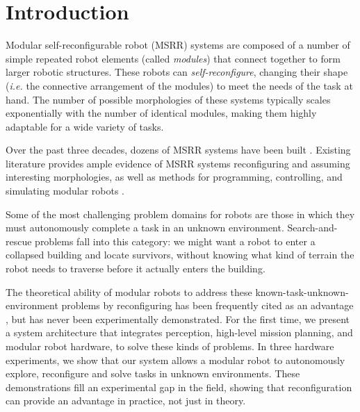 \documentclass[conference]{IEEEtran}
\begin{document}
\IEEEpeerreviewmaketitle


\section{Introduction} \label{sec:introduction}
%
Modular self-reconfigurable robot (MSRR) systems are composed of a number of simple repeated robot elements (called \emph{modules}) that connect together to form larger robotic structures. These robots can \emph{self-reconfigure}, changing their shape (\emph{i.e.} the connective arrangement of the modules) to meet the needs of the task at hand.
The number of possible morphologies of these systems typically scales exponentially with the number of identical modules, making them highly adaptable for a wide variety of tasks.

Over the past three decades, dozens of MSRR systems have been built \cite{Yim2007a}. Existing literature provides ample evidence of MSRR systems reconfiguring and assuming interesting morphologies, as well as methods for programming, controlling, and simulating modular robots \cite{Yim2007,Jing2016,Yim1994}.

Some of the most challenging problem domains for robots are those in which they must autonomously complete a task in an unknown environment.  Search-and-rescue problems fall into this category: we might want a robot to enter a collapsed building and locate survivors, without knowing what kind of terrain the robot needs to traverse before it actually enters the building.

The theoretical ability of modular robots to address these known-task-unknown-environment problems by reconfiguring has been frequently cited as an advantage \cite{Yim2007a}, but has never been experimentally demonstrated.  For the first time, we present a system architecture that integrates perception, high-level mission planning, and modular robot hardware, to solve these kinds of problems. In three hardware experiments, we show that our system allows a modular robot to autonomously explore, reconfigure and solve tasks in unknown environments.  These demonstrations fill an experimental gap in the field, showing that reconfiguration can provide an advantage in practice, not just in theory.
\end{document}
